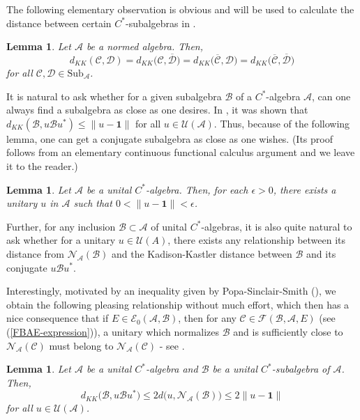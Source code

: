 \documentclass{amsart}
\numberwithin{equation}{section}
\newcommand{\mcal}{\mathcal}
\newcommand{\1}{\mathbf{1}}
\newcommand{\mU}{\mathcal{U}}
\newcommand{\mA}{\mathcal{A}}
\newcommand{\mB}{\mathcal{B}}
\newcommand{\mC}{\mathcal{C}}
\newcommand{\mD}{\mathcal{D}}
\newcommand{\mN}{\mathcal{N}}
\newtheorem{lemma}[theorem]{Lemma}
\begin{document}
The following elementary observation is obvious and will be used to
calculate the distance between certain $C^*$-subalgebras in .

\begin{lemma}\label{dense-distance}
Let $\mA$ be a normed algebra. Then,
\[
d_{KK}(\mC, \mD) = d_{KK}\big(\mC, \overline{\mD}\big) = d_{KK}\big(\overline{\mC}, \mD\big) =
d_{KK}\big(\overline{\mC},\overline{ \mD}\big)
\]
for all $\mC, \mD \in \mathrm{Sub}_{\mA}$.
\end{lemma}
It is natural to ask whether for a given subalgebra $\mB$ of a
$C^*$-algebra $\mA$, can one always find a subalgebra as close as one
desires. In \cite[Example, 2.2.2]{IN}, it was shown that $d_{KK}(\mB,
u \mB u^*) \leq \|u - \1\|$ for all $u \in \mU(\mA)$. Thus, because of
the following lemma, one can get a conjugate subalgebra as close as
one wishes.  (Its proof follows from an elementary continuous
functional calculus argument and we leave it to the reader.)

\begin{lemma}\label{close-unitary}
Let $\mathcal{A}$ be a unital $C^{*}$-algebra. Then, for each
$\epsilon > 0$, there exists a unitary $ u$ in  $\mathcal{A}$ such
that $0< \|u- \1\| < \epsilon$. 
\end{lemma}

Further, for any inclusion $\mB \subset \mA$ of unital
$C^*$-algebras, it is also quite natural to ask whether for a unitary
$u \in \mathcal{U}(A)$, there exists any relationship between its
distance from $ \mN_{\mA}(\mB)$ and the Kadison-Kastler distance
between $\mB$ and its conjugate $u \mB u^*$.


Interestingly, motivated by an inequality given by Popa-Sinclair-Smith
(\cite[Lemma 6.3]{Po}), we obtain the following pleasing relationship
without much effort, which then has a nice consequence that if $E \in
\mathcal{E}_0(\mA, \mB)$, then for any $\mC \in \mcal{F}(\mB, \mA, E)$
(see (\ref{FBAE-expression})), a unitary which normalizes $\mB$ and is
sufficiently close to $\mN_{\mA}(\mC)$ must belong to $\mN_{\mA}(\mC)$
- see .


\begin{lemma}\label{Normaliser-distance}\label{u-1-relation}
Let $\mA$ be a unital $C^*$-algebra and $\mB$ be a unital
$C^*$-subalgebra of $\mA$. Then, 
$$
d_{KK}\big(\mB, u\mB u^{*}\big)\leq 2d\big(u, \mN_{\mA}(\mB)\big) \leq 2 \|u - \1\|
$$
for all $u\in \mcal{U}(\mA)$.
\end{lemma}
\end{document}
